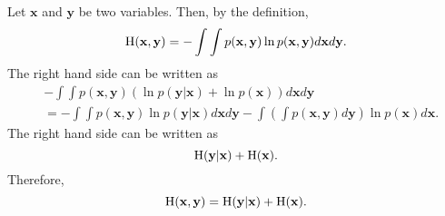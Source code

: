 \subsection{}
\label{1.37}
Let $\mathbf{x}$ and $\mathbf{y}$ be two variables.
Then, by the definition, 
%
\begin{equation}
{\rm H}(\mathbf{x}, \mathbf{y}) = - \int \int p(\mathbf{x}, \mathbf{y}) \ln p(\mathbf{x}, \mathbf{y}) d\mathbf{x} d\mathbf{y}.
\end{equation}
%
The right hand side can be written as
%
\begin{equation}
\begin{aligned}
&- \int \int p(\mathbf{x}, \mathbf{y}) \left( \ln p(\mathbf{y} | \mathbf{x}) + \ln p(\mathbf{x}) \right) d\mathbf{x} d\mathbf{y} \\
&= - \int \int p(\mathbf{x}, \mathbf{y}) \ln p(\mathbf{y} | \mathbf{x}) d\mathbf{x} d\mathbf{y} - \int \left( \int p(\mathbf{x}, \mathbf{y}) d\mathbf{y} \right) \ln p(\mathbf{x}) d\mathbf{x}.
\end{aligned}
\end{equation}
%
The right hand side can be written as
%
\begin{equation}
{\rm H}(\mathbf{y} | \mathbf{x}) + {\rm H}(\mathbf{x}).
\end{equation}
%
Therefore,
%
\begin{equation}
{\rm H}(\mathbf{x}, \mathbf{y}) = {\rm H}(\mathbf{y} | \mathbf{x}) + {\rm H}(\mathbf{x}).
\end{equation}
%


